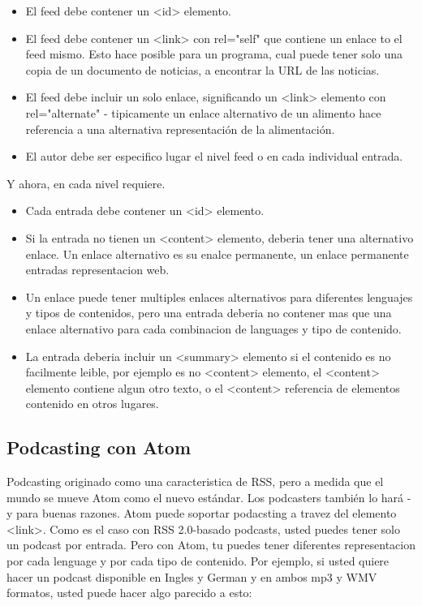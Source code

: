 \begin{itemize}

\item El feed debe contener un <id> elemento.
\item El feed debe contener un <link> con rel="self" que contiene un enlace to el feed mismo. Esto hace posible para
un programa, cual puede tener solo una copia de un documento de noticias, a encontrar la URL de las noticias.
\item El feed debe incluir un solo enlace, significando un <link> elemento con rel="alternate" - tipicamente un enlace
alternativo de un alimento hace referencia a una alternativa representación de la alimentación.
\item El autor debe ser especifico lugar el nivel feed o en cada individual entrada.

\end{itemize}

Y ahora, en cada nivel requiere.

\begin{itemize}

\item Cada entrada debe contener un <id> elemento.
\item Si la entrada no tienen un <content> elemento, deberia tener una alternativo enlace. Un enlace alternativo es su enalce
permanente, un enlace permanente entradas representacion web.
\item Un enlace puede tener multiples enlaces alternativos para diferentes lenguajes y tipos de contenidos, pero una entrada
deberia no contener mas que una enlace alternativo para cada combinacion de languages y tipo de contenido.
\item La entrada deberia incluir un <summary> elemento si el contenido es no facilmente leible, por ejemplo es no <content> 
elemento, el <content> elemento contiene algun otro texto, o el <content> referencia de elementos contenido en otros lugares.

\end{itemize}

\subsection{Podcasting con Atom}

Podcasting originado como una caracteristica de RSS, pero a medida que el mundo se mueve Atom como el nuevo estándar.
Los podcasters también lo hará - y para buenas razones. Atom puede soportar podacsting a travez del elemento <link>.
Como es el caso con RSS 2.0-basado podcasts, usted puedes tener solo un podcast por entrada. Pero con Atom, tu puedes
tener diferentes representacion por cada lenguage y por cada tipo de contenido. Por ejemplo, si usted quiere hacer un
podcast disponible en Ingles y German y en ambos mp3 y WMV formatos, usted puede hacer algo parecido a esto:

